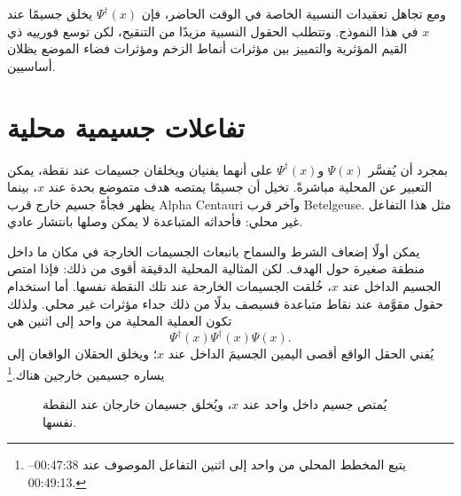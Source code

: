 ومع تجاهل تعقيدات النسبية الخاصة في الوقت الحاضر، فإن \(\Psi^\dagger(x)\) يخلق جسيمًا عند \(x\) في هذا النموذج. وتتطلب الحقول النسبية مزيدًا من التنقيح، لكن توسع فورييه ذي القيم المؤثرية والتمييز بين مؤثرات أنماط الزخم ومؤثرات فضاء الموضع يظلان أساسيين.

\begin{classroomqa}
\end{classroomqa}

\section{تفاعلات جسيمية محلية}

بمجرد أن يُفسَّر \(\Psi(x)\) و\(\Psi^\dagger(x)\) على أنهما يفنيان ويخلقان جسيمات عند نقطة، يمكن التعبير عن المحلية مباشرةً. تخيل أن جسيمًا يمتصه هدف متموضع بحدة عند \(x\)، بينما يظهر فجأةً جسيم خارج قرب Alpha Centauri وآخر قرب Betelgeuse. مثل هذا التفاعل غير محلي: فأحداثه المتباعدة لا يمكن وصلها بانتشار عادي.

يمكن أولًا إضعاف الشرط والسماح بانبعاث الجسيمات الخارجة في مكان ما داخل منطقة صغيرة حول الهدف. لكن المثالية المحلية الدقيقة أقوى من ذلك: فإذا امتص الجسيم الداخل عند \(x\)، خُلقت الجسيمات الخارجة عند تلك النقطة نفسها. أما استخدام حقول مقوَّمة عند نقاط متباعدة فسيصف بدلًا من ذلك جداء مؤثرات غير محلي. ولذلك تكون العملية المحلية من واحد إلى اثنين هي
\begin{equation}
\Psi^\dagger(x)\Psi^\dagger(x)\Psi(x).
\end{equation}
يُفني الحقل الواقع أقصى اليمين الجسيمَ الداخل عند \(x\)؛ ويخلق الحقلان الواقعان إلى يساره جسيمين خارجين هناك.\footnote{يتبع المخطط المحلي من واحد إلى اثنين التفاعل الموصوف عند 00:47:38--00:49:13.}

\begin{figure}[t]
\centering
{}
\caption{يُمتص جسيم داخل واحد عند \(x\)، ويُخلق جسيمان خارجان عند النقطة نفسها.}
\end{figure}

